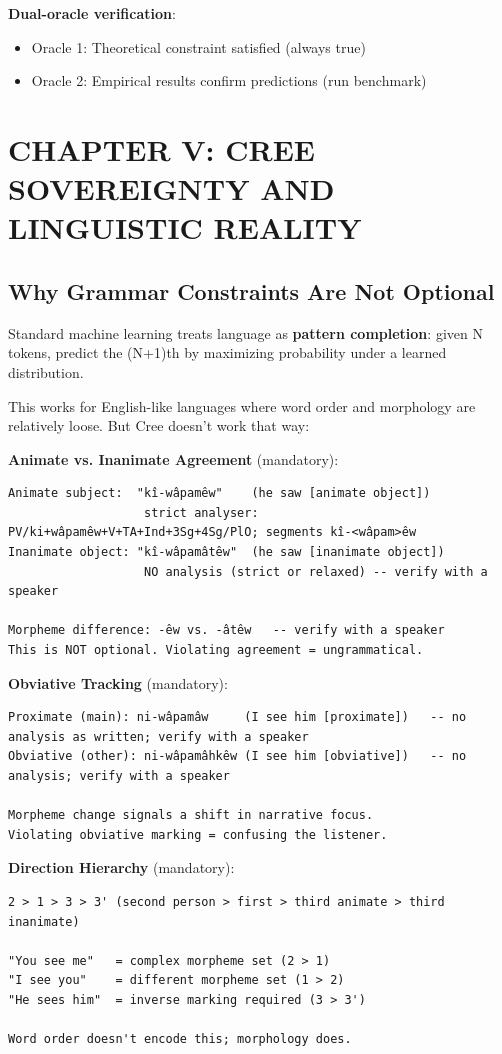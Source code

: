 \documentclass[11pt,oneside]{article}
\begin{document}
\textbf{Dual-oracle verification}:
\begin{itemize}
  \item Oracle 1: Theoretical constraint satisfied (always true)
  \item Oracle 2: Empirical results confirm predictions (run benchmark)
\end{itemize}

\section{CHAPTER V: CREE SOVEREIGNTY AND LINGUISTIC REALITY}

\subsection{Why Grammar Constraints Are Not Optional}

Standard machine learning treats language as \textbf{pattern completion}: given N tokens, predict the (N+1)th by maximizing probability under a learned distribution.

This works for English-like languages where word order and morphology are relatively loose. But Cree doesn't work that way:

\textbf{Animate vs. Inanimate Agreement} (mandatory):
\begin{lstlisting}
Animate subject:  "kî-wâpamêw"    (he saw [animate object])
                   strict analyser: PV/ki+wâpamêw+V+TA+Ind+3Sg+4Sg/PlO; segments kî-<wâpam>êw
Inanimate object: "kî-wâpamâtêw"  (he saw [inanimate object])
                   NO analysis (strict or relaxed) -- verify with a speaker

Morpheme difference: -êw vs. -âtêw   -- verify with a speaker
This is NOT optional. Violating agreement = ungrammatical.
\end{lstlisting}

\textbf{Obviative Tracking} (mandatory):
\begin{lstlisting}
Proximate (main): ni-wâpamâw     (I see him [proximate])   -- no analysis as written; verify with a speaker
Obviative (other): ni-wâpamâhkêw (I see him [obviative])   -- no analysis; verify with a speaker

Morpheme change signals a shift in narrative focus.
Violating obviative marking = confusing the listener.
\end{lstlisting}

\textbf{Direction Hierarchy} (mandatory):
\begin{lstlisting}
2 > 1 > 3 > 3' (second person > first > third animate > third inanimate)

"You see me"   = complex morpheme set (2 > 1)
"I see you"    = different morpheme set (1 > 2)
"He sees him"  = inverse marking required (3 > 3')

Word order doesn't encode this; morphology does.
\end{lstlisting}
\end{document}
